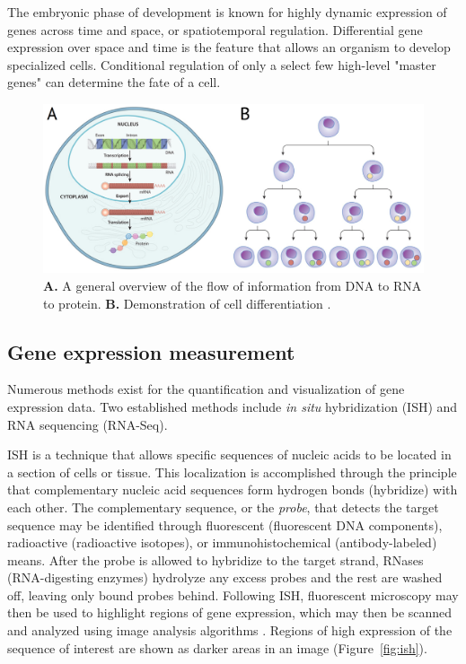 \documentclass[12pt,oneside,onecolumn,a4paper]{article}
\begin{document}
The embryonic phase of development is known for highly dynamic expression of genes across time and space, or spatiotemporal regulation. Differential gene expression over space and time is the feature that allows an organism to develop specialized cells. Conditional regulation of only a  select few high-level "master genes" can determine the fate of a cell. 
\citep{bisceglia_2010}

\begin{figure}[h!]
\begin{center}
\includegraphics[width=0.8\columnwidth]{figures/dna_flow}
\caption{\textbf{A.} A general overview of the flow of information from DNA to RNA to protein. \textbf{B.} Demonstration of cell differentiation \citep{bisceglia_2010}.%
}
\end{center}
\end{figure}

\subsection{Gene expression measurement}
Numerous methods exist for the quantification and visualization of gene expression data. Two established methods include \textit{in situ} hybridization (ISH) and RNA sequencing (RNA-Seq). 

ISH is a technique that allows specific sequences of nucleic acids to be located in a section of cells or tissue. This localization is accomplished through the principle that complementary nucleic acid sequences form hydrogen bonds (hybridize) with each other. The complementary sequence, or the \textit{probe}, that detects the target sequence may be identified through fluorescent (fluorescent DNA components), radioactive (radioactive isotopes), or immunohistochemical (antibody-labeled) means. After the probe is allowed to hybridize to the target strand, RNases (RNA-digesting enzymes) hydrolyze any excess probes and the rest are washed off, leaving only bound probes behind. Following ISH, fluorescent microscopy may then be used to highlight regions of gene expression, which may then be scanned and analyzed using image analysis algorithms \citep{Angerer_1991}. Regions of high expression of the sequence of interest are shown as darker areas in an image (Figure~\ref{fig:ish}). 
\end{document}
